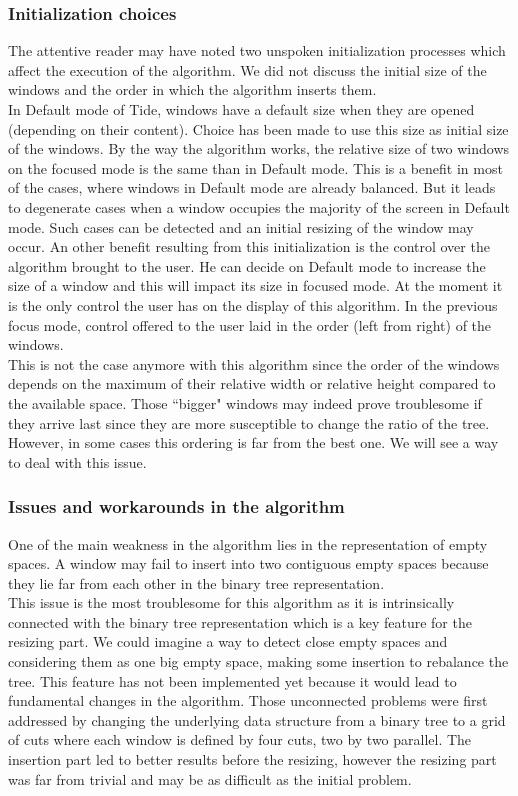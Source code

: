 \documentclass{acmtog}
\begin{document}
\subsubsection{Initialization choices}

The attentive reader may have noted two unspoken initialization processes which affect the execution of the algorithm. We did not discuss the initial size of the windows and the order in which the algorithm inserts them. \\
In Default mode of Tide, windows have a default size when they are opened (depending on their content). Choice has been made to use this size as initial size of the windows. By the way the algorithm works, the relative size of two windows on the focused mode is the same than in Default mode. This is a benefit in most of the cases, where windows in Default mode are already balanced. But it leads to degenerate cases when a window occupies the majority of the screen in Default mode. Such cases can be detected and an initial resizing of the window may occur. An other benefit resulting from this initialization is the control over the algorithm brought to the user. He can decide on Default mode to increase the size of a window and this will impact its size in focused mode. At the moment it is the only control the user has on the display of this algorithm. In the previous focus mode, control offered to the user laid in the order (left from right) of the windows. \\
This is not the case anymore with this algorithm since the order of the windows depends on the maximum of their relative width or relative height compared to the available space. Those ``bigger" windows may indeed prove troublesome if they arrive last since they are more susceptible to change the ratio of the tree. However, in some cases this ordering is far from the best one. We will see a way to deal with this issue.

\subsubsection{Issues and workarounds in the algorithm}

One of the main weakness in the algorithm lies in the representation of empty spaces. A window may fail to insert into two contiguous empty spaces because they lie far from each other in the binary tree representation. \\
This issue is the most troublesome for this algorithm as it is intrinsically connected with the binary tree representation which is a key feature for the resizing part. We could imagine a way to detect close empty spaces and considering them as one big empty space, making some insertion to rebalance the tree. This feature has not been implemented yet because it would lead to fundamental changes in the algorithm. Those unconnected problems were first addressed by changing the underlying data structure from a binary tree to a grid of cuts where each window is defined by four cuts, two by two parallel. The insertion part led to better results before the resizing, however the resizing part was far from trivial and may be as difficult as the initial problem.
\end{document}
